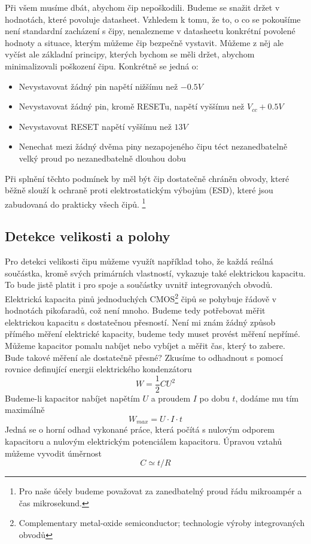 \documentclass[11pt,a4paper,twoside,openright]{report}
\begin{document}
Při všem musíme dbát, abychom čip nepoškodili. Budeme se snažit držet v hodnotách, které povoluje datasheet. Vzhledem k tomu, že to, o co se pokoušíme není standardní zacházení s čipy, nenalezneme v datasheetu konkrétní povolené hodnoty a situace, kterým můžeme čip bezpečně vystavit. Můžeme z něj ale vyčíst ale základní principy, kterých bychom se měli držet, abychom minimalizovali poškození čipu. Konkrétně se jedná o:
\begin{itemize}
	\item Nevystavovat žádný pin napětí nižšímu než $-0.5V$
	\item Nevystavovat žádný pin, kromě RESETu, napětí vyššímu než ${V}_{cc} + 0.5V$
	\item Nevystavovat RESET napětí vyššímu než $13V$
	\item Nenechat mezi žádný dvěma piny nezapojeného čipu téct nezanedbatelně velký proud po nezanedbatelně dlouhou dobu
\end{itemize}
Při splnění těchto podmínek by měl být čip dostatečně chráněn obvody, které běžně slouží k ochraně proti elektrostatickým výbojům (ESD), které jsou zabudovaná do prakticky všech čipů. \footnote{Pro naše účely budeme považovat za zanedbatelný proud řádu mikroampér a čas mikrosekund.}

\subsection {Detekce velikosti a polohy \label{theory:capacitance}}

Pro detekci velikosti čipu můžeme využít například toho, že každá reálná součástka, kromě svých primárních vlastností, vykazuje také elektrickou kapacitu. To bude jistě platit i pro spoje a součástky uvnitř integrovaných obvodů. Elektrická kapacita pinů jednoduchých CMOS\footnote{Complementary metal-oxide semiconductor; technologie výroby integrovaných obvodů} čipů\cite{multiplexer, switch2, switch1} se pohybuje řádově v hodnotách pikofaradů, což není mnoho. Budeme tedy potřebovat měřit elektrickou kapacitu s dostatečnou přesností. Není mi znám žádný způsob přímého měření elektrické kapacity, budeme tedy muset provést měření nepřímé. Můžeme kapacitor pomalu nabíjet nebo vybíjet a měřit čas, který to zabere. Bude takové měření ale dostatečně přesné? Zkusíme to odhadnout s pomocí rovnice definující energii elektrického kondenzátoru \begin{equation} W = \frac{1}{2}CU^2 \end{equation}
Budeme-li kapacitor nabíjet napětím $U$ a proudem $I$ po dobu $t$, dodáme mu tím maximálně
\begin{equation} {W}_{max} = U \cdot I \cdot t \end{equation} 
Jedná se o horní odhad vykonané práce, která počítá s nulovým odporem kapacitoru a nulovým elektrickým potenciálem kapacitoru. Úpravou vztahů můžeme vyvodit úměrnost
\begin{equation} C \simeq t / R \end{equation}
\end{document}
